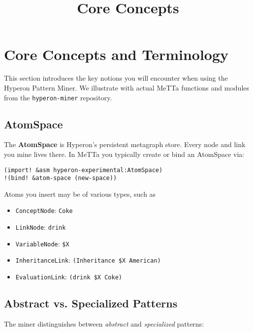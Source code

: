 \documentclass{article}
\title{Core Concepts}
\begin{document}
\section{Core Concepts and Terminology}

This section introduces the key notions you will encounter when using the Hyperon Pattern Miner.  We illustrate with actual MeTTa functions and modules from the \texttt{hyperon-miner} repository.

\subsection{AtomSpace}

The \textbf{AtomSpace} is Hyperon's persistent metagraph store.  Every node and link you mine lives there.  In MeTTa you typically create or bind an AtomSpace via:

\begin{verbatim}
(import! &asm hyperon-experimental:AtomSpace)
!(bind! &atom-space (new-space)) 
\end{verbatim}

Atoms you insert may be of various types, such as

\begin{itemize}
  \item \texttt{ConceptNode}: \verb|Coke|
  \item \texttt{LinkNode}: \verb|drink|
  \item \texttt{VariableNode}:  \verb|$X|
  \item \texttt{InheritanceLink}: 
    \verb|(Inheritance $X American)|
  \item \texttt{EvaluationLink}:  
    \verb|(drink $X Coke)|
\end{itemize}

\subsection{Abstract vs. Specialized Patterns}

The miner distinguishes between \emph{abstract} and \emph{specialized} patterns:
\end{document}
